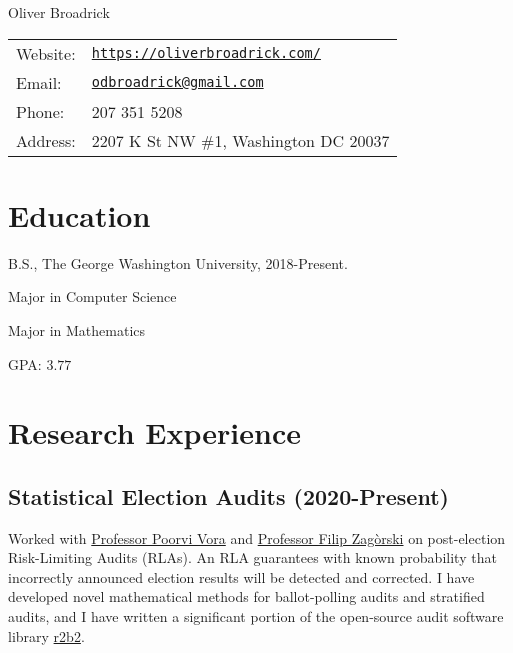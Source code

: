 \documentclass[letterpaper]{article}
\def\name{Oliver Broadrick}
\renewenvironment{itemize}{
  \begin{list}{}{
    \setlength{\leftmargin}{1.5em}
  }
}{
  \end{list}
}
\begin{document}
{\huge \name}

\vspace{0.25in}

\begin{minipage}{0.45\linewidth}
  \begin{tabular}{ll}
    Website: & \href{https://oliverbroadrick.com/}{\tt https://oliverbroadrick.com/} \\
    Email: & \href{mailto:odbroadrick@gmail.com}{\tt odbroadrick@gmail.com} \\
    Phone: & 207 351 5208 \\
    Address: & 2207 K St NW \#1, Washington DC 20037
  \end{tabular}
\end{minipage}


\section*{Education}

\begin{itemize}

\item B.S., The George Washington University, 2018-Present.
\begin{itemize}
  \item Major in Computer Science
  \item Major in Mathematics
  \item GPA: $3.77$
\end{itemize}

\end{itemize}


\section*{Research Experience}

\subsection*{Statistical Election Audits (2020-Present)}
Worked with \href{https://www2.seas.gwu.edu/~poorvi/}{Professor Poorvi Vora} and 
\href{https://zagorski.im.pwr.wroc.pl/}{Professor Filip Zag\`{o}rski} on post-election
Risk-Limiting Audits (RLAs). An RLA guarantees with known probability that incorrectly
announced election results will be detected and corrected.
I have developed novel mathematical methods for ballot-polling audits and stratified audits, 
and I have written a significant portion of the open-source audit software library 
\href{https://github.com/gwexploratoryaudits/r2b2}{r2b2}.
\end{document}

